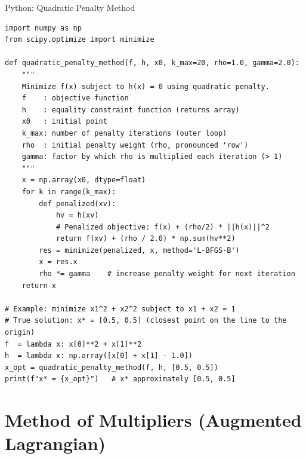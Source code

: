 \documentclass[aspectratio=169,10pt]{beamer}
\begin{document}
\begin{frame}[fragile]{Python: Quadratic Penalty Method}
  \begin{lstlisting}[style=pycode,caption={Quadratic penalty method for equality-constrained minimization}]
import numpy as np
from scipy.optimize import minimize

def quadratic_penalty_method(f, h, x0, k_max=20, rho=1.0, gamma=2.0):
    """
    Minimize f(x) subject to h(x) = 0 using quadratic penalty.
    f    : objective function
    h    : equality constraint function (returns array)
    x0   : initial point
    k_max: number of penalty iterations (outer loop)
    rho  : initial penalty weight (rho, pronounced 'row')
    gamma: factor by which rho is multiplied each iteration (> 1)
    """
    x = np.array(x0, dtype=float)
    for k in range(k_max):
        def penalized(xv):
            hv = h(xv)
            # Penalized objective: f(x) + (rho/2) * ||h(x)||^2
            return f(xv) + (rho / 2.0) * np.sum(hv**2)
        res = minimize(penalized, x, method='L-BFGS-B')
        x = res.x
        rho *= gamma    # increase penalty weight for next iteration
    return x

# Example: minimize x1^2 + x2^2 subject to x1 + x2 = 1
# True solution: x* = [0.5, 0.5] (closest point on the line to the origin)
f  = lambda x: x[0]**2 + x[1]**2
h  = lambda x: np.array([x[0] + x[1] - 1.0])
x_opt = quadratic_penalty_method(f, h, [0.5, 0.5])
print(f"x* = {x_opt}")   # x* approximately [0.5, 0.5]
  \end{lstlisting}
\end{frame}

\section{Method of Multipliers (Augmented Lagrangian)}
\end{document}
